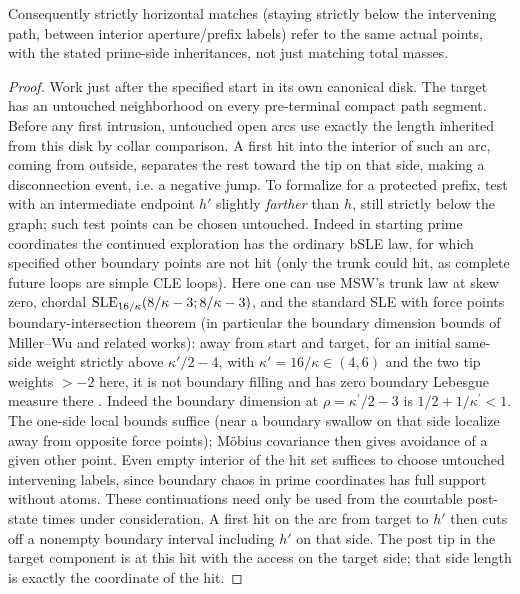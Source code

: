 \begin{lemma}
Consequently strictly horizontal matches (staying strictly below the intervening path, between interior aperture/prefix labels) refer to the same actual points, with the stated prime-side inheritances, not just matching total masses.

\end{lemma}\begin{proof}


Work just after the specified start in its own canonical disk.
The target has an untouched neighborhood on every pre-terminal compact path segment.
Before any first intrusion, untouched open arcs use exactly the length inherited from this disk by collar comparison. A first hit into the interior of such an arc, coming from outside, separates the rest toward the tip on that side, making a disconnection event, i.e. a negative jump.
To formalize for a protected prefix, test with an intermediate endpoint \(h'\) slightly \emph{farther} than \(h\), still strictly below the graph; such test points can be chosen untouched.
Indeed in starting prime coordinates the continued exploration has the ordinary bSLE law, for which specified other boundary points are not hit (only the trunk could hit, as complete future loops are simple CLE loops).
Here one can use MSW's trunk law at skew zero, chordal \({\rm SLE}_{16/\kappa}(8/\kappa-3;8/\kappa-3)\), and the standard SLE with force points boundary-intersection theorem (in particular the boundary dimension bounds of Miller--Wu and related works): away from start and target, for an initial same-side weight strictly above \(\kappa'/2-4\), with \(\kappa'=16/\kappa\in(4,6)\) and the two tip weights \(>-2\) here, it is not boundary filling and has zero boundary Lebesgue measure there \citep[Theorem~1.6]{MillerWuBoundary}.  Indeed the boundary dimension at $\rho=\kappa^\prime/2-3$ is $1/2+1/\kappa^\prime<1$.
The one-side local bounds suffice (near a boundary swallow on that side localize away from opposite force points); Möbius covariance then gives avoidance of a given other point.
Even empty interior of the hit set suffices to choose untouched intervening labels, since boundary chaos in prime coordinates has full support without atoms.
These continuations need only be used from the countable post-state times under consideration. A first hit on the arc from target to \(h'\) then cuts off a nonempty boundary interval including \(h'\) on that side.
The post tip in the target component is at this hit with the access on the target side; that side length is exactly the coordinate of the hit.

\end{proof}
